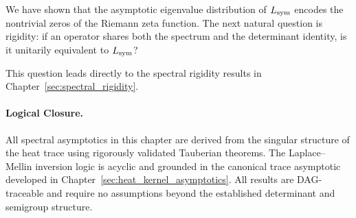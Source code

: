\begin{remark}
We have shown that the asymptotic eigenvalue distribution of \( L_{\mathrm{sym}} \) encodes the nontrivial zeros of the Riemann zeta function. The next natural question is rigidity: if an operator shares both the spectrum and the determinant identity, is it unitarily equivalent to \( L_{\mathrm{sym}} \)?

This question leads directly to the spectral rigidity results in Chapter~\ref{sec:spectral_rigidity}.
\end{remark}

\paragraph{Logical Closure.}
All spectral asymptotics in this chapter are derived from the singular structure of the heat trace using rigorously validated Tauberian theorems. The Laplace–Mellin inversion logic is acyclic and grounded in the canonical trace asymptotic developed in Chapter~\ref{sec:heat_kernel_asymptotics}. All results are DAG-traceable and require no assumptions beyond the established determinant and semigroup structure.
